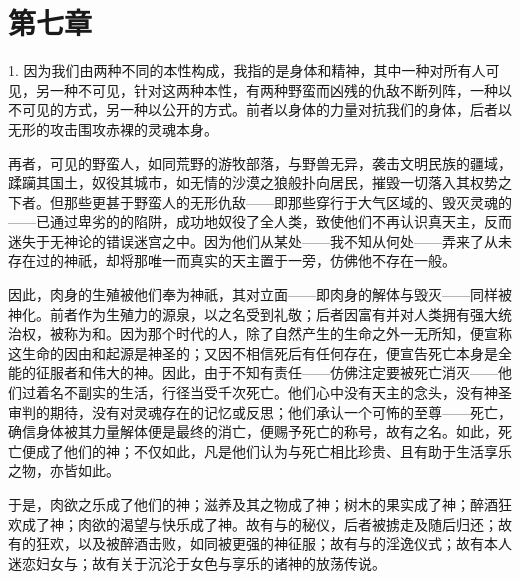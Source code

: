 
\section{第七章}

1. 因为我们由两种不同的本性构成，我指的是身体和精神，其中一种对所有人可见，另一种不可见，针对这两种本性，有两种野蛮而凶残的仇敌不断列阵，一种以不可见的方式，另一种以公开的方式。前者以身体的力量对抗我们的身体，后者以无形的攻击围攻赤裸的灵魂本身。\par

再者，可见的野蛮人，如同荒野的游牧部落，与野兽无异，袭击文明民族的疆域，蹂躏其国土，奴役其城市，如无情的沙漠之狼般扑向居民，摧毁一切落入其权势之下者。但那些更甚于野蛮人的无形仇敌——即那些穿行于大气区域的、毁灭灵魂的——已通过卑劣的的陷阱，成功地奴役了全人类，致使他们不再认识真天主，反而迷失于无神论的错误迷宫之中。因为他们从某处——我不知从何处——弄来了从未存在过的神祇，却将那唯一而真实的天主置于一旁，仿佛他不存在一般。\par

因此，肉身的生殖被他们奉为神祇，其对立面——即肉身的解体与毁灭——同样被神化。前者作为生殖力的源泉，以之名受到礼敬；后者因富有并对人类拥有强大统治权，被称为和。因为那个时代的人，除了自然产生的生命之外一无所知，便宣称这生命的因由和起源是神圣的；又因不相信死后有任何存在，便宣告死亡本身是全能的征服者和伟大的神。因此，由于不知有责任——仿佛注定要被死亡消灭——他们过着名不副实的生活，行径当受千次死亡。他们心中没有天主的念头，没有神圣审判的期待，没有对灵魂存在的记忆或反思；他们承认一个可怖的至尊——死亡，确信身体被其力量解体便是最终的消亡，便赐予死亡的称号，故有之名。如此，死亡便成了他们的神；不仅如此，凡是他们认为与死亡相比珍贵、且有助于生活享乐之物，亦皆如此。\par

于是，肉欲之乐成了他们的神；滋养及其之物成了神；树木的果实成了神；醉酒狂欢成了神；肉欲的渴望与快乐成了神。故有与的秘仪，后者被掳走及随后归还；故有的狂欢，以及被醉酒击败，如同被更强的神征服；故有与的淫逸仪式；故有本人迷恋妇女与；故有关于沉沦于女色与享乐的诸神的放荡传说。\par

